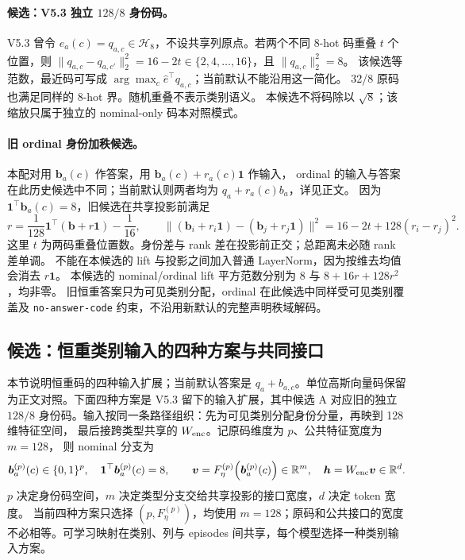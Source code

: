\documentclass[11pt,UTF8,fontset=fandol]{ctexart}
\numberwithin{equation}{section}
\theoremstyle{definition}
\newcommand{\R}{\mathbb R}
\begin{document}
\paragraph{候选：V5.3 独立 $128/8$ 身份码。}
V5.3 曾令 $e_a(c)=q_{a,c}\in\mathcal H_8$，不设共享列原点。若两个不同 8-hot 码重叠 $t$ 个位置，则
$\|q_{a,c}-q_{a,c'}\|_2^2=16-2t\in\{2,4,\ldots,16\}$，且 $\|q_{a,c}\|_2^2=8$。
该候选等范数，最近码可写成 $\arg\max_c\widehat e^\top q_{a,c}$；当前默认不能沿用这一简化。
32/8 原码也满足同样的 8-hot 界。随机重叠不表示类别语义。
本候选不将码除以 $\sqrt8$；该缩放只属于独立的 nominal-only 码本对照模式。


\paragraph{旧 ordinal 身份加秩候选。}
本配对用 $\bm b_a(c)$ 作答案，用 $\bm b_a(c)+r_a(c)\bm1$ 作输入，
ordinal 的输入与答案在此历史候选中不同；当前默认则两者均为 $q_a+r_a(c)b_a$，详见正文。
因为 $\bm1^\top\bm b_a(c)=8$，旧候选在共享投影前满足
\begin{equation}
 r=\frac1{128}\bm1^\top(\bm b+r\bm1)-\frac1{16},\qquad
 \|(\bm b_i+r_i\bm1)-(\bm b_j+r_j\bm1)\|^2
 =16-2t+128(r_i-r_j)^2.
 \label{v53c:eq:legacy-ordinal-lift}
\end{equation}
这里 $t$ 为两码重叠位置数。身份差与 rank 差在投影前正交；总距离未必随 rank 差单调。
不能在本候选的 lift 与投影之间加入普通 LayerNorm，因为按维去均值会消去 $r\bm1$。
本候选的 nominal/ordinal lift 平方范数分别为 $8$ 与 $8+16r+128r^2$，均非零。
旧恒重答案只为可见类别分配，ordinal 在此候选中同样受可见类别覆盖及
\texttt{no-answer-code} 约束，不沿用新默认的完整声明秩域解码。

\subsection{候选：恒重类别输入的四种方案与共同接口}
\label{subsec:alt:categorical-input}

本节说明恒重码的四种输入扩展；当前默认答案是 $q_a+b_{a,c}$。单位高斯向量码保留为正文对照。下面四种方案是 V5.3 留下的输入扩展，其中候选 A 对应旧的独立 $128/8$ 身份码。输入按同一条路径组织：先为可见类别分配身份分量，再映到 128 维特征空间，
最后接跨类型共享的 $W_{\rm enc}$。记原码维度为 $p$、公共特征宽度为 $m=128$，
则 nominal 分支为
\begin{equation}
 \bm b_a^{(p)}(c)\in\{0,1\}^{p},\quad
 \bm1^\top\bm b_a^{(p)}(c)=8,\qquad
 \bm v=F_\eta^{(p)}\!\left(\bm b_a^{(p)}(c)\right)\in\R^{m},\quad
 \bm h=W_{\rm enc}\bm v\in\R^d.
 \label{eq:alt:categorical-interface}
\end{equation}
$p$ 决定身份码空间，$m$ 决定类型分支交给共享投影的接口宽度，$d$ 决定 token 宽度。
当前四种方案只选择 $(p,F_\eta^{(p)})$，均使用 $m=128$；原码和公共接口的宽度
不必相等。可学习映射在类别、列与 episodes 间共享，每个模型选择一种类别输入方案。
\end{document}
